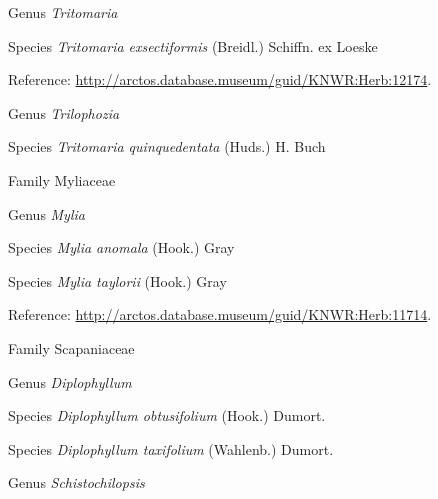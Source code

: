 \documentclass[9pt, article]{memoir}
\begin{document}
\begin{multicols}{2}
\vspace{6pt}\noindent\hspace{30pt}Genus \textit{Tritomaria}


\vspace{6pt}\noindent\hspace{36pt}Species \textit{Tritomaria exsectiformis} (Breidl.) Schiffn. ex Loeske


Reference: 
\url{http://arctos.database.museum/guid/KNWR:Herb:12174}.

\vspace{6pt}\noindent\hspace{30pt}Genus \textit{Trilophozia}


\vspace{6pt}\noindent\hspace{36pt}Species \textit{Tritomaria quinquedentata} (Huds.) H. Buch


\vspace{6pt}\noindent\hspace{24pt}Family Myliaceae


\vspace{6pt}\noindent\hspace{30pt}Genus \textit{Mylia}


\vspace{6pt}\noindent\hspace{36pt}Species \textit{Mylia anomala} (Hook.) Gray


\vspace{6pt}\noindent\hspace{36pt}Species \textit{Mylia taylorii} (Hook.) Gray


Reference: 
\url{http://arctos.database.museum/guid/KNWR:Herb:11714}.

\vspace{6pt}\noindent\hspace{24pt}Family Scapaniaceae


\vspace{6pt}\noindent\hspace{30pt}Genus \textit{Diplophyllum}


\vspace{6pt}\noindent\hspace{36pt}Species \textit{Diplophyllum obtusifolium} (Hook.) Dumort.


\vspace{6pt}\noindent\hspace{36pt}Species \textit{Diplophyllum taxifolium} (Wahlenb.) Dumort.


\vspace{6pt}\noindent\hspace{30pt}Genus \textit{Schistochilopsis}



\end{multicols}
\end{document}
